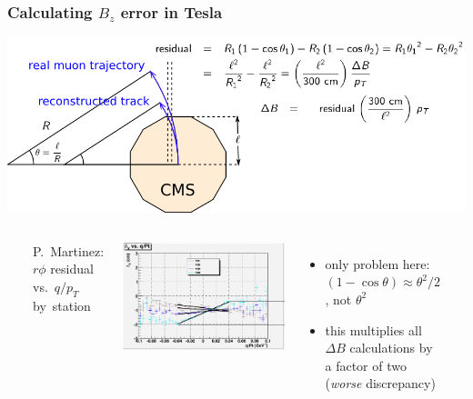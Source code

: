 \documentclass[compress]{beamer}
\begin{document}
\setcounter{page}{9}

\begin{frame}
\frametitle{Calculating $B_z$ error in Tesla}

\vspace{0.3 cm}
\includegraphics[width=\linewidth]{geometry.png}

\begin{columns}
\mbox{ }

\scriptsize P.\ Martinez: $r\phi$ residual vs.\ $q/p_T$ \mbox{by station\hspace{-1 cm}}

\vspace{0.05 cm}
\includegraphics[width=\linewidth]{pmartinez.png}


\vspace{-3.2 cm}
\begin{itemize}
\item only problem here: $(1 - \cos\theta) \approx \theta^2/2$, not $\theta^2$
\item this multiplies all $\Delta B$ calculations by a factor of two ({\it worse} discrepancy)
\end{itemize}

\vspace{-1.5 cm}
\mbox{ }
\end{columns}
\end{frame}
\end{document}

